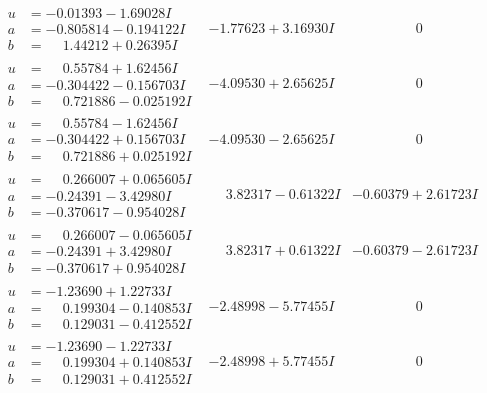 \documentclass[1p]{elsarticle_modified}
\theoremstyle{definition}
\begin{document}
$$\begin{array}{c|c|c}
\begin{aligned}
u &= -0.01393 - 1.69028 I \\
a &= -0.805814 - 0.194122 I \\
b &= \phantom{-}1.44212 + 0.26395 I\end{aligned}
 & -1.77623 + 3.16930 I & \phantom{-0.000000 } 0 \\ \hline\begin{aligned}
u &= \phantom{-}0.55784 + 1.62456 I \\
a &= -0.304422 - 0.156703 I \\
b &= \phantom{-}0.721886 - 0.025192 I\end{aligned}
 & -4.09530 + 2.65625 I & \phantom{-0.000000 } 0 \\ \hline\begin{aligned}
u &= \phantom{-}0.55784 - 1.62456 I \\
a &= -0.304422 + 0.156703 I \\
b &= \phantom{-}0.721886 + 0.025192 I\end{aligned}
 & -4.09530 - 2.65625 I & \phantom{-0.000000 } 0 \\ \hline\begin{aligned}
u &= \phantom{-}0.266007 + 0.065605 I \\
a &= -0.24391 - 3.42980 I \\
b &= -0.370617 - 0.954028 I\end{aligned}
 & \phantom{-}3.82317 - 0.61322 I & -0.60379 + 2.61723 I \\ \hline\begin{aligned}
u &= \phantom{-}0.266007 - 0.065605 I \\
a &= -0.24391 + 3.42980 I \\
b &= -0.370617 + 0.954028 I\end{aligned}
 & \phantom{-}3.82317 + 0.61322 I & -0.60379 - 2.61723 I \\ \hline\begin{aligned}
u &= -1.23690 + 1.22733 I \\
a &= \phantom{-}0.199304 - 0.140853 I \\
b &= \phantom{-}0.129031 - 0.412552 I\end{aligned}
 & -2.48998 - 5.77455 I & \phantom{-0.000000 } 0 \\ \hline\begin{aligned}
u &= -1.23690 - 1.22733 I \\
a &= \phantom{-}0.199304 + 0.140853 I \\
b &= \phantom{-}0.129031 + 0.412552 I\end{aligned}
 & -2.48998 + 5.77455 I & \phantom{-0.000000 } 0 \\ \hline\begin{aligned}

\end{aligned}
\end{array}$$
\end{document}
